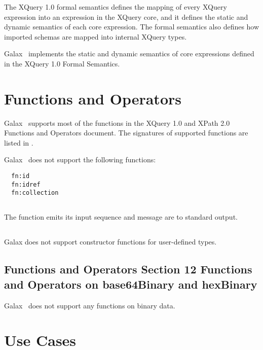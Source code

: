   The XQuery 1.0 formal semantics defines the mapping of every XQuery
  expression into an expression in the XQuery core, and it defines the
  static and dynamic semantics of each core expression.  The formal
  semantics also defines how imported schemas are mapped into internal
  XQuery types.
  
  Galax \version\ implements the static and dynamic semantics of core
  expressions defined in the XQuery 1.0 Formal Semantics. 

\section{Functions and Operators}

  Galax \version\ supports most of the functions in the XQuery 1.0 and
  XPath 2.0 Functions and Operators document.  The signatures of
  supported functions are listed in .

  Galax \version\ does not support the following functions: 
\begin{verbatim}
  fn:id
  fn:idref
  fn:collection
\end{verbatim}

\subsection*{}

    The  function emits its input sequence and message are to standard output. 

\subsection*{}
Galax \version does not support constructor functions for user-defined
types. 

\subsection*{Functions and Operators Section 12 Functions and Operators on base64Binary and hexBinary}

 Galax \version\ does not support any functions on binary data.


\section{Use Cases}

